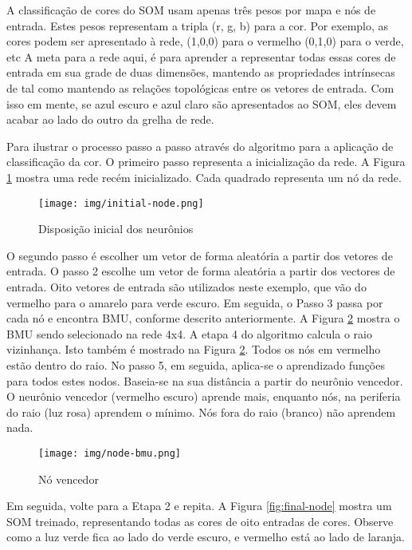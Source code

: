 \documentclass[a4paper]{article}
\begin{document}
A classificação de cores do SOM usam apenas três pesos por mapa e nós de entrada.
Estes pesos representam a tripla (r, g, b) para a cor. Por exemplo, as cores podem
ser apresentado à rede, (1,0,0) para o vermelho (0,1,0) para o verde, etc A meta para
a rede aqui, é para aprender a representar todas essas cores de entrada em sua grade de duas dimensões,
mantendo as propriedades intrínsecas de tal como mantendo as
relações topológicas entre os vetores de entrada. Com isso em mente, se azul escuro
e azul claro são apresentados ao SOM, eles devem acabar ao lado do outro
da grelha de rede.

Para ilustrar o processo passo a passo através do algoritmo para a
aplicação de classificação da cor. O primeiro passo representa a inicialização da rede. A Figura \ref{fig:initial-node}
mostra uma rede recém inicializado. Cada quadrado representa um nó da rede.

\begin{figure}[ht]
\centering
\texttt{[image: img/initial-node.png]}
\caption{Disposição inicial dos neurônios}
\label{fig:initial-node}
\end{figure}


O segundo passo é escolher um vetor de forma aleatória a partir dos vetores de entrada.
O passo 2 escolhe um vetor de forma aleatória a partir dos vectores de entrada. Oito vetores de entrada
são utilizados neste exemplo, que vão do vermelho para o amarelo para verde escuro. Em seguida,
o Passo 3 passa por cada nó e encontra BMU, conforme descrito anteriormente. A Figura \ref{fig:bmu-node}
mostra o BMU sendo selecionado na rede 4x4. A etapa 4 do
algoritmo calcula o raio vizinhança. Isto também é mostrado na Figura \ref{fig:bmu-node}. Todos
os nós em vermelho estão dentro do raio. No passo 5, em seguida, aplica-se o aprendizado
funções para todos estes nodos. Baseia-se na sua distância a partir do neurônio vencedor. O
neurônio vencedor (vermelho escuro) aprende mais, enquanto nós, na periferia do raio (luz
rosa) aprendem o mínimo. Nós fora do raio (branco) não aprendem nada.

\begin{figure}[ht]
\centering
\texttt{[image: img/node-bmu.png]}
\caption{Nó vencedor}
\label{fig:bmu-node}
\end{figure}

Em seguida, volte para a Etapa 2 e repita. A Figura \ref{fig:final-node} mostra um SOM treinado,
representando todas as cores de oito entradas de cores. Observe como a luz verde fica ao lado do verde escuro,
e vermelho está ao lado de laranja.
\end{document}
